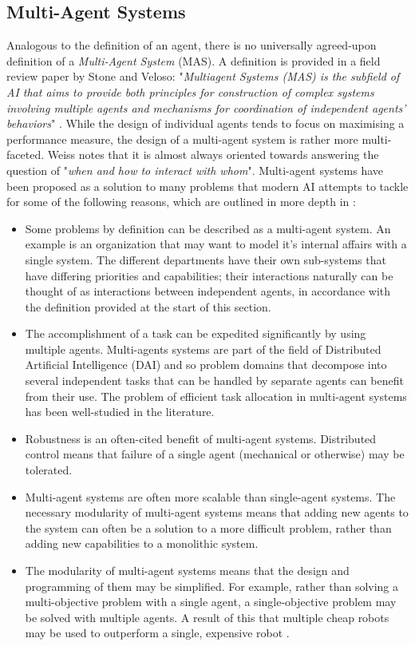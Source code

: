 \subsection{Multi-Agent Systems}
Analogous to the definition of an agent, there is no universally agreed-upon definition of a \emph{Multi-Agent System} (MAS). A definition is provided in a field review paper by Stone and Veloso: "\textit{Multiagent Systems (MAS) is the subfield of AI that aims to provide both principles for construction of  complex  systems  involving  multiple  agents  and  mechanisms  for  coordination  of  independent  agents’ behaviors}" \cite{Stone2000MultiagentPerspective}. While the design of individual agents tends to focus on maximising a performance measure, the design of a multi-agent system is rather more multi-faceted. Weiss \cite{MAS:AModernApproachToDAI} notes that it is almost always oriented towards answering the question of "\textit{when and how to interact with whom}". Multi-agent systems have been proposed as a solution to many problems that modern AI attempts to tackle for some of the following reasons, which are outlined in more depth in \cite{Stone2000MultiagentPerspective}: 
\begin{itemize}
    \item Some problems by definition can be described as a multi-agent system. An example is an organization that may want to model it's internal affairs with a single system. The different departments have their own sub-systems that have differing priorities and capabilities; their interactions naturally can be thought of as interactions between independent agents, in accordance with the definition provided at the start of this section.
    \item The accomplishment of a task can be expedited significantly by using multiple agents. Multi-agents systems are part of the field of Distributed Artificial Intelligence (DAI) and so problem domains that decompose into several independent tasks that can be handled by separate agents can benefit from their use. The problem of efficient task allocation in multi-agent systems has been well-studied in the literature\cite{Gerkey2004ASystems}. 
    \item Robustness is an often-cited benefit of multi-agent systems. Distributed control means that failure of a single agent (mechanical or otherwise) may be tolerated.
    \item Multi-agent systems are often more scalable than single-agent systems. The necessary modularity of multi-agent systems means that adding new agents to the system can often be a solution to a more difficult problem, rather than adding new capabilities to a monolithic system. 
    \item The modularity of multi-agent systems means that the design and programming of them may be simplified. For example, rather than solving a multi-objective problem with a single agent, a single-objective problem may be solved with multiple agents. A result of this that multiple cheap robots may be used to outperform a single, expensive robot \cite{Grabowski2000HeterogeneousExploration}.
\end{itemize}
\par

